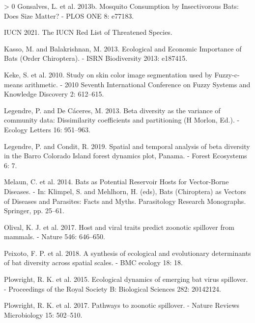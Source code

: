 \documentclass[11pt]{article}
\newlength{\cslhangindent}
\newenvironment{CSLReferences}[3] %
 {%
  \setlength{\parindent}{0pt}
  \ifodd #1 \everypar{\setlength{\hangindent}{\cslhangindent}}\ignorespaces\fi
  \ifnum #2 > 0
  \setlength{\parskip}{#2\baselineskip}
  \fi
 }%
 {}
\begin{document}
\begin{CSLReferences}{1}{0}
\leavevmode\hypertarget{ref-Gonsalves2013MosCon}{}%
Gonsalves, L. et al. 2013b. Mosquito Consumption by Insectivorous Bats:
Does Size Matter? - PLOS ONE 8: e77183.

\leavevmode\hypertarget{ref-IUCN2021IucRed}{}%
IUCN 2021. The IUCN Red List of Threatened Species.

\leavevmode\hypertarget{ref-Kasso2013EcoEco}{}%
Kasso, M. and Balakrishnan, M. 2013. Ecological and Economic Importance
of Bats (Order Chiroptera). - ISRN Biodiversity 2013: e187415.

\leavevmode\hypertarget{ref-Keke2010StuSki}{}%
Keke, S. et al. 2010. Study on skin color image segmentation used by
Fuzzy-c-means arithmetic. - 2010 Seventh International Conference on
Fuzzy Systems and Knowledge Discovery 2: 612--615.

\leavevmode\hypertarget{ref-Legendre2013BetDiv}{}%
Legendre, P. and De Cáceres, M. 2013. Beta diversity as the variance of
community data: Dissimilarity coefficients and partitioning (H Morlon,
Ed.). - Ecology Letters 16: 951--963.

\leavevmode\hypertarget{ref-Legendre2019SpaTem}{}%
Legendre, P. and Condit, R. 2019. Spatial and temporal analysis of beta
diversity in the Barro Colorado Island forest dynamics plot, Panama. -
Forest Ecosystems 6: 7.

\leavevmode\hypertarget{ref-Melaun2014BatPot}{}%
Melaun, C. et al. 2014. Bats as Potential Reservoir Hosts for
Vector-Borne Diseases. - In: Klimpel, S. and Mehlhorn, H. (eds), Bats
(Chiroptera) as Vectors of Diseases and Parasites: Facts and Myths.
Parasitology Research Monographs. Springer, pp. 25--61.

\leavevmode\hypertarget{ref-Olival2017HosVir}{}%
Olival, K. J. et al. 2017. Host and viral traits predict zoonotic
spillover from mammals. - Nature 546: 646--650.

\leavevmode\hypertarget{ref-Peixoto2018SynEco}{}%
Peixoto, F. P. et al. 2018. A synthesis of ecological and evolutionary
determinants of bat diversity across spatial scales. - BMC ecology 18:
18.

\leavevmode\hypertarget{ref-Plowright2015EcoDyn}{}%
Plowright, R. K. et al. 2015. Ecological dynamics of emerging bat virus
spillover. - Proceedings of the Royal Society B: Biological Sciences
282: 20142124.

\leavevmode\hypertarget{ref-Plowright2017PatZoo}{}%
Plowright, R. K. et al. 2017. Pathways to zoonotic spillover. - Nature
Reviews Microbiology 15: 502--510.


\end{CSLReferences}
\end{document}
